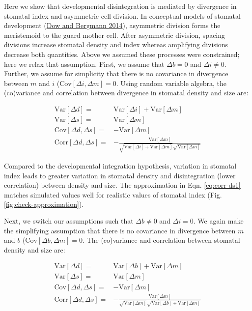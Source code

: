 \documentclass[
  12pt,
]{article}
\begin{document}
Here we show that developmental disintegration is mediated by divergence in stomatal index and asymmetric cell division. In conceptual models of stomatal development (\protect\hyperlink{ref-dow_patterning_2014}{Dow and Bergmann 2014}), asymmetric division forms the meristemoid to the guard mother cell. After asymmetric division, spacing divisions increase stomatal density and index whereas amplifying divisions decrease both quantities. Above we assumed these processes were constrained; here we relax that assumption. First, we assume that \(\Delta b = 0\) and \(\Delta i \ne 0\). Further, we assume for simplicity that there is no covariance in divergence between \(m\) and \(i\) (\(\textrm{Cov}[\Delta i, \Delta m] = 0\). Using random variable algebra, the (co)variance and correlation between divergence in stomatal density and size are:

\begin{align}
  \textrm{Var}[\Delta d] = & \textrm{Var}[\Delta i] + \textrm{Var}[\Delta m] \\
  \textrm{Var}[\Delta s] = & \textrm{Var}[\Delta m] \\
  \textrm{Cov}[\Delta d, \Delta s] = & -\textrm{Var}[\Delta m] \\
  \textrm{Corr}[\Delta d, \Delta s] = & -\frac{\textrm{Var}[\Delta m]}{\sqrt{\textrm{Var}[\Delta i] + \textrm{Var}[\Delta m]}\sqrt{\textrm{Var}[\Delta m]}} \label{eq:corr-ds1}
\end{align}

Compared to the developmental integration hypothesis, variation in stomatal index leads to greater variation in stomatal density and disintegration (lower correlation) between density and size. The approximation in Eqn. \ref{eq:corr-ds1} matches simulated values well for realistic values of stomatal index (Fig. \ref{fig:check-approximation}).

Next, we switch our assumptions such that \(\Delta b \ne 0\) and \(\Delta i = 0\). We again make the simplifying assumption that there is no covariance in divergence between \(m\) and \(b\) (\(\textrm{Cov}[\Delta b, \Delta m] = 0\). The (co)variance and correlation between stomatal density and size are:

\begin{align}
  \textrm{Var}[\Delta d] = & \textrm{Var}[\Delta b] + \textrm{Var}[\Delta m] \\
  \textrm{Var}[\Delta s] = & \textrm{Var}[\Delta m] \\
  \textrm{Cov}[\Delta d, \Delta s] = & -\textrm{Var}[\Delta m] \\
  \textrm{Corr}[\Delta d, \Delta s] = & -\frac{\textrm{Var}[\Delta m]}{\sqrt{\textrm{Var}[\Delta m]}\sqrt{\textrm{Var}[\Delta b] + \textrm{Var}[\Delta m]}}
\end{align}
\end{document}
